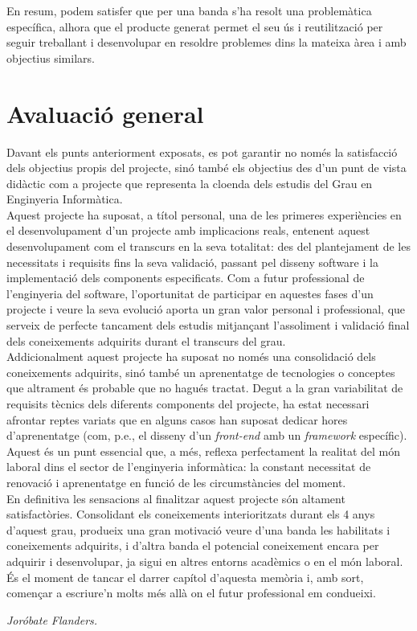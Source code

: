 En resum, podem satisfer que per una banda s'ha resolt una problemàtica específica, alhora que el producte generat permet el seu ús i reutilització per seguir treballant i desenvolupar en resoldre problemes dins la mateixa àrea i amb objectius similars.

\section{Avaluació general}

Davant els punts anteriorment exposats, es pot garantir no només la satisfacció dels objectius propis del projecte, sinó també els objectius des d'un punt de vista didàctic com a projecte que representa la cloenda dels estudis del Grau en Enginyeria Informàtica.\\

Aquest projecte ha suposat, a títol personal, una de les primeres experiències en el desenvolupament d'un projecte amb implicacions reals, entenent aquest desenvolupament com el transcurs en la seva totalitat: des del plantejament de les necessitats i requisits fins la seva validació, passant pel disseny software i la implementació dels components especificats. Com a futur professional de l'enginyeria del software, l'oportunitat de participar en aquestes fases d'un projecte i veure la seva evolució aporta un gran valor personal i professional, que serveix de perfecte tancament dels estudis mitjançant l'assoliment i validació final dels coneixements adquirits durant el transcurs del grau.\\

Addicionalment aquest projecte ha suposat no només una consolidació dels coneixements adquirits, sinó també un aprenentatge de tecnologies o conceptes que altrament és probable que no hagués tractat. Degut a la gran variabilitat de requisits tècnics dels diferents components del projecte, ha estat necessari afrontar reptes variats que en alguns casos han suposat dedicar hores d'aprenentatge (com, p.e., el disseny d'un \textit{front-end} amb un \textit{framework} específic). Aquest és un punt essencial que, a més, reflexa perfectament la realitat del món laboral dins el sector de l'enginyeria informàtica: la constant necessitat de renovació i aprenentatge en funció de les circumstàncies del moment.\\

En definitiva les sensacions al finalitzar aquest projecte són altament satisfactòries. Consolidant els coneixements interioritzats durant els 4 anys d'aquest grau, produeix una gran motivació veure d'una banda les habilitats i coneixements adquirits, i d'altra banda el potencial coneixement encara per adquirir i desenvolupar, ja sigui en altres entorns acadèmics o en el món laboral. És el moment de tancar el darrer capítol d'aquesta memòria i, amb sort, començar a escriure'n molts més allà on el futur professional em condueixi. 

\begin{center}
\textit{Joróbate Flanders.}
\end{center}